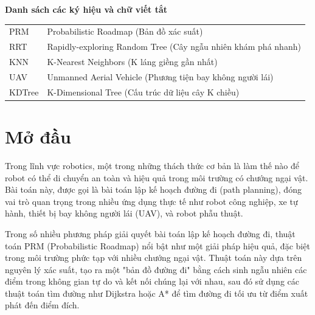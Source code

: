 \documentclass[12pt,a4paper,openany,oneside]{report}
\begin{document}

\newpage 
{} 

\listoffigures


\newpage 
{} 
\listoftables

	\newpage
{}

\begin{center}
	{\LARGE
		{\bf Danh sách các ký hiệu và chữ viết tắt}}
\end{center}
\vspace{1.25cm}
{\fontsize{13}{13}\selectfont
	\begin{tabular}{ll}
		PRM & Probabilistic Roadmap (Bản đồ xác suất)\\
		RRT & Rapidly-exploring Random Tree (Cây ngẫu nhiên khám phá nhanh)\\
		KNN & K-Nearest Neighbors (K láng giềng gần nhất)\\
		UAV & Unmanned Aerial Vehicle (Phương tiện bay không người lái)\\
		KDTree & K-Dimensional Tree (Cấu trúc dữ liệu cây K chiều)\\
	\end{tabular}
}

\newpage
{} 
\pagestyle{fancy} 

\chapter*{Mở đầu}

Trong lĩnh vực robotics, một trong những thách thức cơ bản là làm thế nào để robot có thể di chuyển an toàn và hiệu quả trong môi trường có chướng ngại vật. Bài toán này, được gọi là bài toán lập kế hoạch đường đi (path planning), đóng vai trò quan trọng trong nhiều ứng dụng thực tế như robot công nghiệp, xe tự hành, thiết bị bay không người lái (UAV), và robot phẫu thuật.

Trong số nhiều phương pháp giải quyết bài toán lập kế hoạch đường đi, thuật toán PRM (Probabilistic Roadmap) nổi bật như một giải pháp hiệu quả, đặc biệt trong môi trường phức tạp với nhiều chướng ngại vật. Thuật toán này dựa trên nguyên lý xác suất, tạo ra một "bản đồ đường đi" bằng cách sinh ngẫu nhiên các điểm trong không gian tự do và kết nối chúng lại với nhau, sau đó sử dụng các thuật toán tìm đường như Dijkstra hoặc A* để tìm đường đi tối ưu từ điểm xuất phát đến điểm đích.
\end{document}
